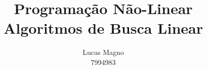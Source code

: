 \documentclass[a4paper,11pt]{article}
\date{}
\author{Lucas Magno \\ 7994983}
\title{Programação Não-Linear \\ Algoritmos de Busca Linear}
\begin{document}
    \begin{figure}
        \centering
        
    \end{figure}

    \begin{figure}
        \centering
        
    \end{figure}

    \begin{figure}
        \centering
        
    \end{figure}
\end{document}
